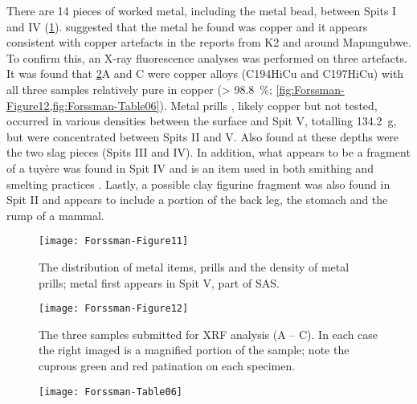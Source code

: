 There are 14 pieces  of worked metal, including the metal bead, between Spits I and IV (\cref{fig:Forssman-Figure11}). \textcite{Walker_1994} 
suggested that the metal he found was copper and it appears consistent with copper artefacts in the
\citeauthor{Miller_2001} 
reports from K2 and around Mapungubwe. 
To confirm this, an X-ray fluorescence analyses was performed on three artefacts. 
It was found that \cref{fig:Forssman-Figure12}A and C were copper alloys (C194HiCu and C197HiCu) with all three samples relatively pure in copper (> \SI{98.8}{\percent}; \cref{fig:Forssman-Figure12,fig:Forssman-Table06}). 
Metal prills \parencite[see][]{Miller_2001}, 
likely copper but not tested, occurred in various densities between the surface and Spit V, totalling \SI{134.2}{\gram}, 
but were concentrated between Spits II and V. Also found at these depths were the two slag pieces (Spits III and IV). 
In addition, what appears to be a fragment of a tuyère was found in Spit IV and is an item used in both smithing and smelting practices \parencites{Miller_2001}{Miller_2002}. 
Lastly, a possible clay figurine fragment was also found in Spit II and appears to include a portion of the back leg, the stomach and the rump of a mammal.

	\begin{figure} %
		\texttt{[image: Forssman-Figure11]}
		\caption{The distribution of metal items, prills and the density of metal prills; metal first appears in Spit V, part of SAS.}
		\label{fig:Forssman-Figure11}
	\end{figure}

	\begin{figure} %
		\texttt{[image: Forssman-Figure12]}
		\caption{The three samples submitted for XRF analysis (A – C). In each case the right imaged is a magnified portion of the sample; note the cuprous green and red patination on each specimen.}
		\label{fig:Forssman-Figure12}
	\end{figure}

    	\begin{figure} %
    		\texttt{[image: Forssman-Table06]}
    		\centering
    		\label{fig:Forssman-Table06}
    	\end{figure}

